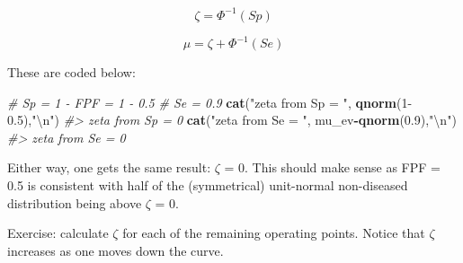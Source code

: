 \documentclass[
]{book}
\newenvironment{Shaded}{\begin{snugshade}}{\end{snugshade}}
\newcommand{\CharTok}[1]{\textcolor[rgb]{0.31,0.60,0.02}{#1}}
\newcommand{\CommentTok}[1]{\textcolor[rgb]{0.56,0.35,0.01}{\textit{#1}}}
\newcommand{\DecValTok}[1]{\textcolor[rgb]{0.00,0.00,0.81}{#1}}
\newcommand{\FloatTok}[1]{\textcolor[rgb]{0.00,0.00,0.81}{#1}}
\newcommand{\KeywordTok}[1]{\textcolor[rgb]{0.13,0.29,0.53}{\textbf{#1}}}
\newcommand{\NormalTok}[1]{#1}
\newcommand{\OperatorTok}[1]{\textcolor[rgb]{0.81,0.36,0.00}{\textbf{#1}}}
\newcommand{\StringTok}[1]{\textcolor[rgb]{0.31,0.60,0.02}{#1}}
\begin{document}
\begin{equation*} 
\zeta = \Phi^{-1}\left ( Sp \right )
\label{eq:ratings-paradigm-Zeta}
\end{equation*}

\begin{equation*} 
\mu = \zeta + \Phi^{-1}\left ( Se \right )
\label{eq:ratings-paradigm-Mu}
\end{equation*}

These are coded below:

\begin{Shaded}
\begin{Highlighting}[]
\CommentTok{# Sp = 1 - FPF = 1 - 0.5}
\CommentTok{# Se = 0.9}
\KeywordTok{cat}\NormalTok{(}\StringTok{"zeta from Sp = "}\NormalTok{, }\KeywordTok{qnorm}\NormalTok{(}\DecValTok{1}\FloatTok{-0.5}\NormalTok{),}\StringTok{"}\CharTok{\textbackslash{}n}\StringTok{"}\NormalTok{)}
\CommentTok{#> zeta from Sp =  0}
\KeywordTok{cat}\NormalTok{(}\StringTok{"zeta from Se = "}\NormalTok{, mu_ev}\OperatorTok{-}\KeywordTok{qnorm}\NormalTok{(}\FloatTok{0.9}\NormalTok{),}\StringTok{"}\CharTok{\textbackslash{}n}\StringTok{"}\NormalTok{)}
\CommentTok{#> zeta from Se =  0}
\end{Highlighting}
\end{Shaded}

Either way, one gets the same result: \(\zeta\) = 0. This should make sense as FPF = 0.5 is consistent with half of the (symmetrical) unit-normal non-diseased distribution being above \(\zeta\) = 0.

Exercise: calculate \(\zeta\) for each of the remaining operating points. Notice that \(\zeta\) increases as one moves down the curve.
\end{document}
